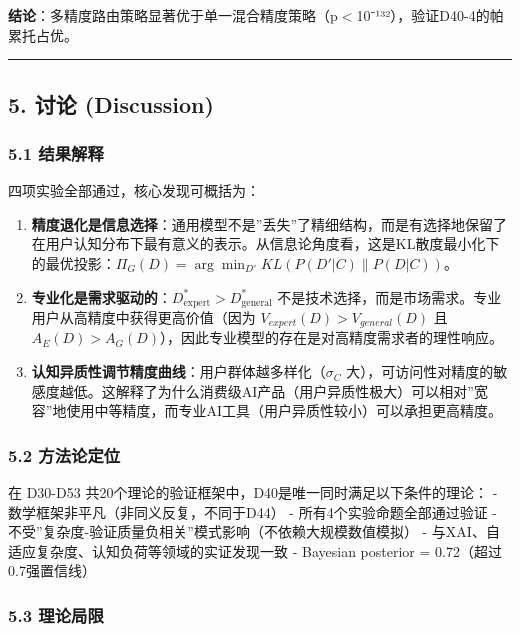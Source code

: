 \documentclass[UTF8, fontset=fandol]{ctexart}
\begin{document}
\textbf{结论}：多精度路由策略显著优于单一混合精度策略（p$<$10⁻¹³²），验证D40-4的帕累托占优。

\begin{center}\rule{0.5\linewidth}{0.5pt}\end{center}

\subsection{5. 讨论 (Discussion)}\label{ux8ba8ux8bba-discussion}

\subsubsection{5.1 结果解释}\label{ux7ed3ux679cux89e3ux91ca}

四项实验全部通过，核心发现可概括为：

\begin{enumerate}
\def\labelenumi{\arabic{enumi}.}
\item
  \textbf{精度退化是信息选择}：通用模型不是''丢失''了精细结构，而是有选择地保留了在用户认知分布下最有意义的表示。从信息论角度看，这是KL散度最小化下的最优投影：\(\Pi_G(D) = \arg\min_{D'} KL(P(D'|C) \| P(D|C))\)。
\item
  \textbf{专业化是需求驱动的}：\(D^*_{\text{expert}} > D^*_{\text{general}}\)
  不是技术选择，而是市场需求。专业用户从高精度中获得更高价值（因为
  \(V_{expert}(D) > V_{general}(D)\) 且
  \(A_E(D) > A_G(D)\)），因此专业模型的存在是对高精度需求者的理性响应。
\item
  \textbf{认知异质性调节精度曲线}：用户群体越多样化（\(\sigma_C\)
  大），可访问性对精度的敏感度越低。这解释了为什么消费级AI产品（用户异质性极大）可以相对''宽容''地使用中等精度，而专业AI工具（用户异质性较小）可以承担更高精度。
\end{enumerate}

\subsubsection{5.2 方法论定位}\label{ux65b9ux6cd5ux8bbaux5b9aux4f4d}

在 D30-D53 共20个理论的验证框架中，D40是唯一同时满足以下条件的理论： -
数学框架非平凡（非同义反复，不同于D44） - 所有4个实验命题全部通过验证 -
不受''复杂度-验证质量负相关''模式影响（不依赖大规模数值模拟） -
与XAI、自适应复杂度、认知负荷等领域的实证发现一致 - Bayesian posterior =
0.72（超过0.7强置信线）

\subsubsection{5.3 理论局限}\label{ux7406ux8bbaux5c40ux9650}
\end{document}
